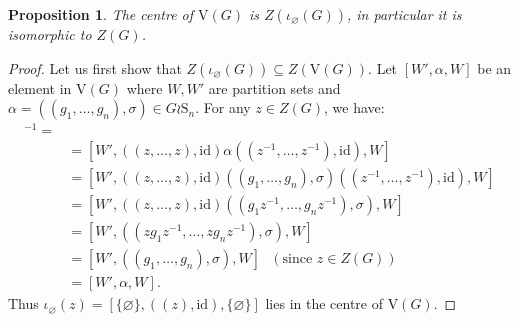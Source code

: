 \documentclass[10pt,a4paper]{amsart}
\numberwithin{equation}{section}
\numberwithin{figure}{section}
\newtheorem{prop}[thm]{Proposition}
\theoremstyle{definition}
\newcommand{\V}{\mathrm{V}}
\begin{document}
\begin{prop}
\label{prop:centre-VG}
The centre of $\V(G)$ is $Z(\iota_\varnothing(G))$, in particular it is isomorphic to $Z(G)$.
\end{prop}
\begin{proof}
Let us first show that $Z(\iota_\varnothing(G))\subseteq Z(\V(G))$. Let $[W', \alpha, W]$ be an element in $\V(G)$ where $W,W'$ are partition sets and $\alpha = ((g_1,\ldots,g_n), \sigma)\in G\wr \mathrm{S}_n$. For any $z\in Z(G)$, we have: 
\begin{align*}
[\{\varnothing\},((z),\mathrm{id}),\{\varnothing\}] [W', \alpha, W] [\{\varnothing\}, & ((z),\mathrm{id}),\{\varnothing\}]^{-1} = \\
       &=[W', ((z,\ldots, z),\mathrm{id})\alpha ((z^{-1},\ldots,z^{-1}),\mathrm{id}) ,W] \\
       &= [W', ((z,\ldots, z),\mathrm{id}) ((g_1,\ldots,g_n), \sigma)  ((z^{-1},\ldots,z^{-1}),\mathrm{id}) ,W] \\
       &=[W', ((z,\ldots, z),\mathrm{id}) ((g_1z^{-1},\ldots,g_nz^{-1}), \sigma),W]  \\
       & = [W', ((zg_1z^{-1},\ldots,zg_nz^{-1}), \sigma),W]  \\
       & = [W', ((g_1,\ldots,g_n), \sigma),W] ~~~(\text{since } z \in Z(G)) \\
       & = [W', \alpha, W].
\end{align*}
Thus $\iota_\varnothing(z) = [\{\varnothing\},((z),\mathrm{id}),\{\varnothing\}]$ lies in the centre of $\V(G)$.


\end{proof}
\end{document}

